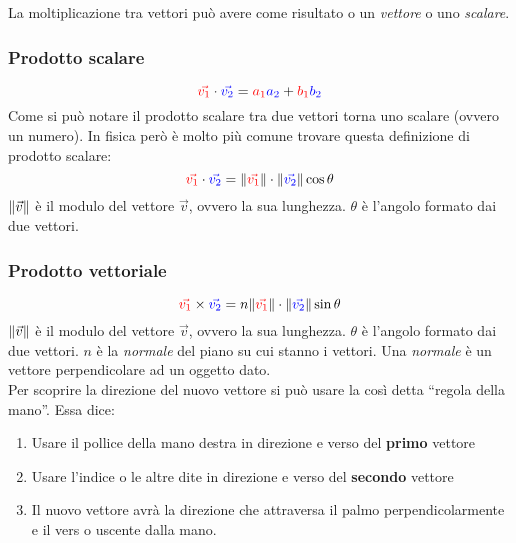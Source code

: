 La moltiplicazione tra vettori può avere come risultato o un \emph{vettore} o uno \emph{scalare}.

\subsubsection{Prodotto scalare}
\begin{equation*}
  \mathcolor{red}{\vec{v_1}} \cdot \mathcolor{blue}{\vec{v_2}} = 
  \mathcolor{red}{a_1}\mathcolor{blue}{a_2} + \mathcolor{red}{b_1}\mathcolor{blue}{b_2}
\end{equation*}
Come si può notare il prodotto scalare tra due vettori torna uno scalare (ovvero un numero).
In fisica però è molto più comune trovare questa definizione di prodotto scalare:
\begin{equation*}
  \mathcolor{red}{\vec{v_1}} \cdot \mathcolor{blue}{\vec{v_2}} =
  \norm{\mathcolor{red}{\vec{v_1}}}\cdot\norm{\mathcolor{blue}{\vec{v_2}}}\cos\theta
\end{equation*}
$\lVert\vec{v}\rVert$ è il modulo del vettore $\vec{v}$, ovvero la sua lunghezza. $\theta$ è l'angolo
formato dai due vettori.

\subsubsection{Prodotto vettoriale}\label{subsec:vettori:prodottoVettoriale}
\begin{equation*}
  \mathcolor{red}{\vec{v_1}} \times \mathcolor{blue}{\vec{v_2}} =
  n\norm{\mathcolor{red}{\vec{v_1}}}\cdot\norm{\mathcolor{blue}{\vec{v_2}}}\sin\theta
\end{equation*}
$\lVert\vec{v}\rVert$ è il modulo del vettore $\vec{v}$, ovvero la sua lunghezza. $\theta$ è l'angolo
formato dai due vettori. $n$ è la \emph{normale} del piano su cui stanno i vettori. Una \emph{normale}
è un vettore perpendicolare ad un oggetto dato.\\
Per scoprire la direzione del nuovo vettore si può usare la così detta ``regola della mano''. Essa 
dice:
\begin{enumerate}
  \item Usare il pollice della mano destra in direzione e verso del \textbf{primo} vettore
  \item Usare l'indice o le altre dite in direzione e verso del \textbf{secondo} vettore
  \item Il nuovo vettore avrà la direzione che attraversa il palmo perpendicolarmente e il vers
    o uscente dalla mano.
\end{enumerate}

